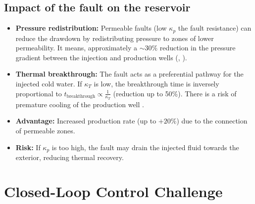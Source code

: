 \documentclass[a4paper,12pt]{report}
\begin{document}
\subsection{Impact of the fault on the reservoir}





\begin{itemize}
    \item \textbf{Pressure redistribution:} Permeable faults (low $\kappa_p$ the fault resistance) can reduce the drawdown by redistributing pressure to zones of lower 
permeability. It means, approximately a $\sim 30\%$ reduction in 
the pressure gradient between the injection and production wells (\cite{7}, \cite{8}).

    \item \textbf{Thermal breakthrough:} The fault acts as a preferential pathway for the injected cold 
water. If $\kappa_T$ is low, the breakthrough time is inversely 
proportional to $t_{\text{breakthrough}} \propto \frac{1}{\kappa_T}$ (reduction up to 50\%). There is a 
risk of premature cooling of the production well \cite{9}.

    \item \textbf{Advantage:} Increased production rate (up to $+20\%$) due to the connection of permeable zones.

    \item \textbf{Risk:} If $\kappa_p$ is too high, the fault may drain the injected fluid towards the exterior, reducing thermal recovery.
\end{itemize}

\section{Closed-Loop Control Challenge}
\end{document}
